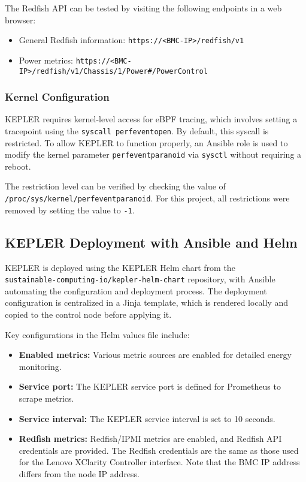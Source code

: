 The Redfish API can be tested by visiting the following endpoints in a web browser:
\begin{itemize}
    \item General Redfish information: \texttt{https://<BMC-IP>/redfish/v1}
    \item Power metrics: \texttt{https://<BMC-IP>/redfish/v1/Chassis/1/Power#/PowerControl}
\end{itemize}

\subsubsection{Kernel Configuration}

KEPLER requires kernel-level access for eBPF tracing, which involves setting a tracepoint using the \texttt{syscall perf\textunderscore event\textunderscore open}. By default, this syscall is restricted. To allow KEPLER to function properly, an Ansible role is used to modify the kernel parameter \texttt{perf\textunderscore event\textunderscore paranoid} via \texttt{sysctl} without requiring a reboot.

The restriction level can be verified by checking the value of \texttt{/proc/sys/kernel/perf\textunderscore event\textunderscore paranoid}. For this project, all restrictions were removed by setting the value to \texttt{-1}.

\subsection{KEPLER Deployment with Ansible and Helm}

KEPLER is deployed using the KEPLER Helm chart\parencite{kepler_helm_chart} from the\\\texttt{sustainable-computing-io/kepler-helm-chart} repository, with Ansible automating the configuration and deployment process. The deployment configuration is centralized in a Jinja template, which is rendered locally and copied to the control node before applying it.

Key configurations in the Helm values file include:
\begin{itemize}
    \item \textbf{Enabled metrics:} Various metric sources are enabled for detailed energy monitoring.
    \item \textbf{Service port:} The KEPLER service port is defined for Prometheus to scrape metrics.
    \item \textbf{Service interval:} The KEPLER service interval is set to 10 seconds.
    \item \textbf{Redfish metrics:} Redfish/IPMI metrics are enabled, and Redfish API credentials are provided. The Redfish credentials are the same as those used for the Lenovo XClarity Controller interface. Note that the BMC IP address differs from the node IP address.
\end{itemize}

